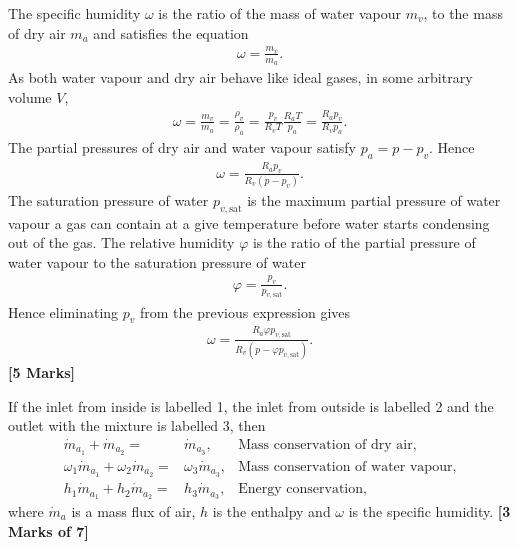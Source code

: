 \documentclass[12pt,twoside]{report}
\renewcommand\phi{\varphi}
\begin{document}
\begin{description}
The specific humidity $\omega$ is the ratio of the mass of water vapour $m_v$, to the mass of dry air $m_a$ and satisfies the equation
\begin{align*}
 \omega = \frac{m_v}{m_a}.
\end{align*}
As both water vapour and dry air behave like ideal gases, in some arbitrary volume $V$,
\begin{align*}
 \omega = \frac{m_v}{m_a} = \frac{\rho_v}{\rho_a} = \frac{p_v}{R_v T} \frac{R_a T}{p_a} = \frac{R_a p_v}{R_v p_a}.
\end{align*}
The partial pressures of dry air and water vapour satisfy $p_a = p - p_v$. Hence
\begin{align*}
 \omega = \frac{R_a p_v}{R_v \left(p - p_v\right)}.
\end{align*} 
The saturation pressure of water $p_{v,\text{sat}}$ is the maximum partial pressure of water vapour a gas can contain at a give temperature before water starts condensing out of the gas. The relative humidity $\phi$ is the ratio of the partial pressure of water vapour to the saturation pressure of water
\begin{align*} 
 \phi = \frac{p_v}{p_{v,\text{sat}}}.
\end{align*}
Hence eliminating $p_v$ from the previous expression gives
\begin{align*}
 \omega = \frac{R_a \phi p_{v,\text{sat}}}{R_v \left(p - \phi p_{v,\text{sat}}\right)}.
\end{align*} \hfill \textbf{[5 Marks]}


If the inlet from inside is labelled 1, the inlet from outside is labelled 2 and the outlet with the mixture is labelled 3, then
\begin{align*}
 \dot{m}_{a_1} + \dot{m}_{a_2} =& \dot{m}_{a_3}, &\mbox{Mass conservation of dry air}, \\
 \omega_1 \dot{m}_{a_1} + \omega_2 \dot{m}_{a_2} =& \omega_3 \dot{m}_{a_3}, &\mbox{Mass conservation of water vapour}, \\
  h_1 \dot{m}_{a_1} + h_2 \dot{m}_{a_2} =& h_3 \dot{m}_{a_3}, &\mbox{Energy conservation},
\end{align*}
where $\dot{m}_a$ is a mass flux of air, $h$ is the enthalpy and $\omega$ is the specific humidity. \hfill \textbf{[3 Marks of 7]}


\end{description}
\end{document}
